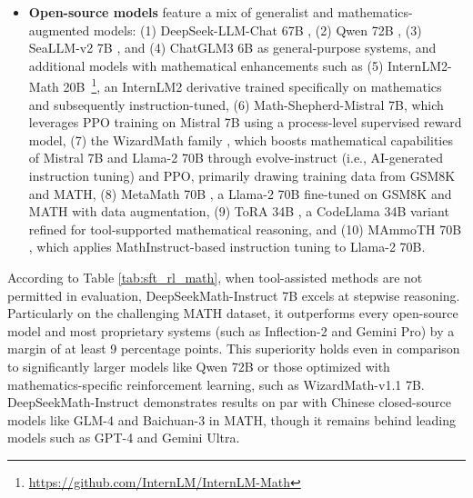 \begin{itemize}[topsep=0pt]
\begin{itemize}[topsep=0pt]
    \item \textbf{Closed-source models} surveyed include: (1) various iterations from the GPT family, with GPT-4 \citep{gpt4} and GPT-4 Code Interpreter~\footnote{\url{https://openai.com/blog/chatgpt-plugins\#\#code-interpreter}} recognized as particularly strong, (2) Gemini Ultra and Gemini Pro \citep{gemini}, (3) Inflection-2 \citep{inflection-2}, (4) Grok-1~\footnote{\url{https://x.ai/model-card}}, and additional models by Chinese enterprises, namely (5) Baichuan-3~\footnote{\url{https://www.baichuan-ai.com}}, (6) the newly released GLM-4~\footnote{\url{https://open.bigmodel.cn/dev/api\#glm-4}} 

    which are part of the GLM family \citep{glm}.
\end{itemize}

The majority of these models are designed for general use and have been subjected to various alignment processes.

\item \textbf{Open-source models} feature a mix of generalist and mathematics-augmented models: (1) DeepSeek-LLM-Chat 67B \citep{deepseek-llm}, (2) Qwen 72B \citep{qwen}, (3) SeaLLM-v2 7B \citep{seallm}, and (4) ChatGLM3 6B \citep{chatglm3} as general-purpose systems, and additional models with mathematical enhancements such as (5) InternLM2-Math 20B~\footnote{\url{https://github.com/InternLM/InternLM-Math}}, an InternLM2 derivative trained specifically on mathematics and subsequently instruction-tuned, (6) Math-Shepherd-Mistral 7B, which leverages PPO training \citep{schulman2017proximal} on Mistral 7B \citep{mistral} using a process-level supervised reward model, (7) the WizardMath family \citep{wizardmath}, which boosts mathematical capabilities of Mistral 7B and Llama-2 70B \citep{llama2} through evolve-instruct (i.e., AI-generated instruction tuning) and PPO, primarily drawing training data from GSM8K and MATH, (8) MetaMath 70B \citep{metamath}, a Llama-2 70B fine-tuned on GSM8K and MATH with data augmentation, (9) ToRA 34B \cite{tora}, a CodeLlama 34B variant refined for tool-supported mathematical reasoning, and (10) MAmmoTH 70B \citep{MathInstruct}, which applies MathInstruct-based instruction tuning to Llama-2 70B.
\end{itemize}

According to Table \ref{tab:sft_rl_math}, when tool-assisted methods are not permitted in evaluation, DeepSeekMath-Instruct 7B excels at stepwise reasoning. Particularly on the challenging MATH dataset, it outperforms every open-source model and most proprietary systems (such as Inflection-2 and Gemini Pro) by a margin of at least 9 percentage points. This superiority holds even in comparison to significantly larger models like Qwen 72B or those optimized with mathematics-specific reinforcement learning, such as WizardMath-v1.1 7B. DeepSeekMath-Instruct demonstrates results on par with Chinese closed-source models like GLM-4 and Baichuan-3 in MATH, though it remains behind leading models such as GPT-4 and Gemini Ultra.

